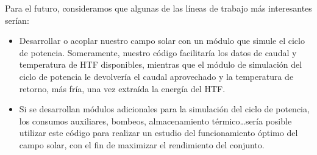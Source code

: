 Para el futuro, consideramos que algunas de las líneas de trabajo más interesantes serían:

\begin{itemize}
\item
Desarrollar o acoplar nuestro campo solar con un módulo que simule el ciclo de potencia. Someramente, nuestro código facilitaría los datos de caudal y temperatura de HTF disponibles, mientras que el módulo de simulación del ciclo de potencia le devolvería el caudal aprovechado y la temperatura de retorno, más fría, una vez extraída la energía del HTF.
\item
Si se desarrollan módulos adicionales para la simulación del ciclo de potencia, los consumos auxiliares, bombeos, almacenamiento térmico\ldots sería posible utilizar este código para realizar un estudio del funcionamiento óptimo del campo solar, con el fin de maximizar el rendimiento del conjunto.
\end{itemize}

